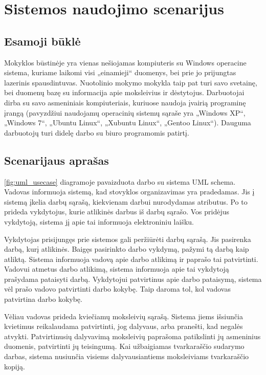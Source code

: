 \chapter{Sistemos naudojimo scenarijus}

\section{Esamoji būklė}

Mokyklos būstinėje yra vienas nešiojamas kompiuteris su Windows operacine
sistema, kuriame laikomi visi „einamieji“ duomenys, bei prie jo prijungtas 
lazerinis spausdintuvas. Nuotolinio mokymo mokykla taip pat turi savo 
svetainę, bei duomenų bazę su informacija apie moksleivius ir dėstytojus.
Darbuotojai dirba su savo asmeniniais kompiuteriais, kuriuose naudoja
įvairią programinę įrangą (pavyzdžiui naudojamų operacinių sistemų 
sąraše yra „Windows XP“, „Windows 7“, „Ubuntu Linux“, „Xubuntu Linux“,
„Gentoo Linux“). Dauguma darbuotojų turi didelę darbo su biuro 
programomis patirtį.

\section{Scenarijaus aprašas}

\ref{fig:uml_usecase} diagramoje pavaizduota darbo su sistema UML schema.
\hfill \\

Vadovas informuoja sistemą, kad stovyklos organizavimas yra pradedamas.
Jis į sistemą įkelia darbų sąrašą, kiekvienam darbui nurodydamas atributus.
Po to         %
prideda vykdytojus, kurie atlikinės darbus iš darbų sąrašo. Vos pridėjus
vykdytoją, sistema jį apie tai informuoja elektroniniu laišku. 

Vykdytojas prisijungęs prie
sistemos gali peržiūrėti darbų sąrašą. Jis pasirenka
darbą, kurį atlikinės. Baigęs pasirinkto darbo vykdymą, pažymi tą
darbą kaip atliktą. Sistema informuoja vadovą apie darbo atlikimą ir
paprašo tai patvirtinti. Vadovui atmetus darbo atlikimą, sistema informuoja
apie tai vykdytoją prašydama pataisyti darbą. Vykdytojui patvirtinus
apie darbo pataisymą, sistema vėl prašo vadovo patvirtinti darbo kokybę. 
Taip daroma tol, kol vadovas patvirtina darbo kokybę. 

Vėliau vadovas prideda kviečiamų moksleivių sąrašą. Sistema jiems išsiunčia
kvietimus reikalaudama patvirtinti, jog dalyvaus, arba pranešti, kad negalės 
atvykti. Patvirtinusių dalyvavimą moksleivių paprašoma patikslinti jų 
asmeninius duomenis, patvirtinti jų teisingumą. Kai užbaigiamas tvarkaraščio
sudarymo darbas, sistema nusiunčia visiems dalyvausiantiems moksleiviams
tvarkaraščio kopiją.

